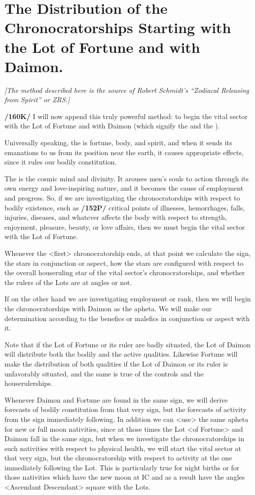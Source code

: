 \section{The Distribution of the Chronocratorships Starting with the Lot of Fortune and with Daimon.}
\textsl{[The method described here is the source of Robert Schmidt's ``Zodiacal Releasing from Spirit'' or ZRS.]}

\textbf{/160K/} I will now append this truly powerful method: to begin the vital sector with the Lot of Fortune and with Daimon (which signify the \Moon\xspace and the \Sun).

Universally speaking, the \Moon\xspace is fortune, body, and
spirit, and when it sends its emanations to us from its position near the earth, it causes appropriate effects, since it rules our bodily constitution. 

The \Sun\xspace is the cosmic mind and divinity. It arouses men’s souls to action through its own energy and love-inspiring nature, and it becomes the cause of employment and progress.
So, if we are investigating the chronocratorships with respect to bodily existence, such as \textbf{/152P/} critical points of illnesses, hemorrhages, falls, injuries, diseases, and whatever affects the body with respect to strength, enjoyment, pleasure, beauty, or love affairs, then we must begin the vital sector with the Lot of Fortune. 

Whenever the <first> chronocratorship ends, at that point we calculate the sign, the stars in conjunction or aspect, how the stars are configured with respect to the overall houseruling star of the vital sector’s chronocratorships, and whether the rulers of the Lots are at angles or not.

If on the other hand we are investigating employment or rank, then we will begin the chronocratorships with Daimon as the apheta. We will make our determination according to the benefics or malefics in conjunction or aspect with it.

Note that if the Lot of Fortune or its ruler are badly situated, the Lot of Daimon will distribute both the bodily and the active qualities. Likewise Fortune will make the distribution of both qualities if the Lot of Daimon or its ruler is unfavorably situated, and the same is true of the controls and the houserulerships.

Whenever Daimon and Fortune are found in the same sign, we will derive forecasts of bodily constitution from that very sign, but the forecasts of activity from the sign immediately following. In addition we can <use> the same apheta for new or full moon nativities, since at those times the Lot <of
Fortune> and Daimon fall in the same sign, but when we investigate the chronocratorships in such nativities with respect to physical health, we will start the vital sector at that very sign, but the chronocratorship with respect to activity at the one immediately following the Lot. This is particularly true for night births or for those nativities which have the new moon at IC and as a result have the angles
<Ascendant Descendant> square with the Lots. 

